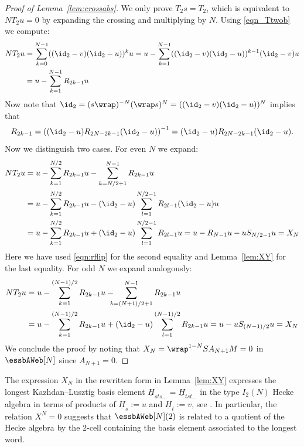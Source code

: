 \begin{proof}[Proof of Lemma~\ref{lem:crossabs}]
We only prove $T_2 s=T_2$, which is equivalent to $N T_2 u=0$ by expanding the crossing and multiplying by $N$. Using \eqref{eqn_Ttwob} we compute: 
\begin{align*} 
  N T_2 u &=  \sum_{k=0}^{N-1} ((\id_2-v)(\id_2-u))^k u = u - \sum_{k=1}^{N-1} ((\id_2-v)(\id_2-u))^{k-1} (\id_2-v)u \\
  &= u - \sum_{k=1}^{N-1} R_{2k -1} u
\end{align*}
Now note that $\id_2 = (s \wrap)^{-N} (\wrap s)^N = ((\id_2-v)(\id_2-u))^N$ implies that 
\begin{equation}
\label{eqn:rflip}
R_{2k-1} = \left( (\id_2-u) R_{2N-2k-1} (\id_2-u)\right)^{-1} = (\id_2-u) R_{2N-2k-1} (\id_2-u).
\end{equation}
Now we distinguish two cases. For even $N$ we expand:
\begin{align*} 
N T_2 u  &= u - \sum_{k=1}^{N/2} R_{2k -1} u - \sum_{k=N/2+1}^{N-1} R_{2k -1} u
\\
&= u - \sum_{k=1}^{N/2} R_{2k -1} u - (\id_2-u)\sum_{l=1}^{N/2-1} R_{2l -1}(\id_2-u)u\\
&= u - \sum_{k=1}^{N/2} R_{2k -1} u + (\id_2-u)\sum_{l=1}^{N/2-1} R_{2l -1}u = u - R_{N-1} u - u S_{N/2-1} u = X_N 
\end{align*}
Here we have used \eqref{eqn:rflip} for the second equality and Lemma~\ref{lem:XY} for the last equality. For odd $N$ we expand analogously:
\begin{align*} 
N T_2 u  &= u - \sum_{k=1}^{(N-1)/2} R_{2k -1} u - \!\!\!\!\sum_{k=(N+1)/2+1}^{N-1} R_{2k -1} u\\
&= u - \sum_{k=1}^{(N-1)/2} R_{2k -1} u + (\id_2-u)\sum_{l=1}^{(N-1)/2} R_{2k -1} u = u- u S_{(N-1)/2}u = X_N
\end{align*}
We conclude the proof by noting that $X_N=\wrap^{1-N} S A_{N+1} M=0$ in $\essbAWeb[N]$ since $A_{N+1}=0$. 
\end{proof}

\begin{rema}
The expression $X_N$ in the rewritten form in Lemma~\ref{lem:XY} expresses the
longest Kazhdan--Lusztig basis element $\underline{H}_{s t
s\dots}=\underline{H}_{t s t\dots}$ in the type $I_2(N)$ Hecke algebra in terms
of products of $\underline{H}_s:=u$ and $\underline{H}_t:=v$, see \cite[Section
2.3]{EW}. In particular, the relation $X^N=0$ suggests that $\essbAWeb[N](2)$ is
related to a quotient of the Hecke algebra by the $2$-cell containing the basis
element associated to the longest word. 
\end{rema}

